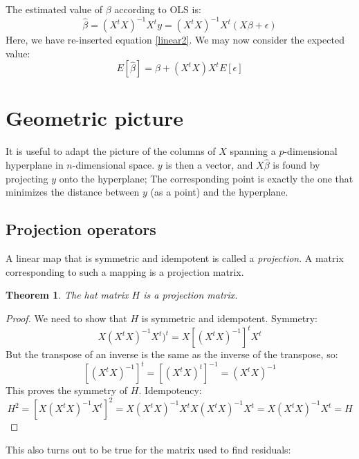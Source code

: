 \documentclass[12pt, a4paper]{article}
\newtheorem{theorem}{Theorem}[section]
\numberwithin{equation}{section}
\begin{document}
The estimated value of $\beta$ according to OLS is:
\begin{equation}
\hat{\beta}=(X^t X)^{-1}X^t y=(X^t X)^{-1}X^t(X\beta+\epsilon)
\end{equation}
Here, we have re-inserted equation \ref{linear2}. We may now consider the expected value:
\begin{equation}
\label{ols_var}
E[\hat{\beta}]=\beta+(X^t X)X^t E[\epsilon]
\end{equation}



\section{Geometric picture}
It is useful to adapt the picture of the columns of $X$ spanning a $p$-dimensional hyperplane in $n$-dimensional space. $y$ is then a vector, and $X\hat{\beta}$ is found by projecting $y$ onto the hyperplane; The corresponding point is exactly the one that minimizes the distance between $y$ (as a point) and the hyperplane.

\subsection{Projection operators}
A linear map that is symmetric and idempotent is called a \textit{projection}. A matrix corresponding to such a mapping is a projection matrix.

\begin{theorem}
The hat matrix $H$ is a projection matrix.
\end{theorem}
\begin{proof}
We need to show that $H$ is symmetric and idempotent. Symmetry:
\begin{equation}
X(X^t X)^{-1}X^t)^t=X\left[(X^t X)^{-1}\right]^t X^t
\end{equation}
But the transpose of an inverse is the same as the inverse of the transpose, so:
\begin{equation}
\left[(X^t X)^{-1}\right]^t=\left[(X^t X)^t\right]^{-1}=(X^t X)^{-1}
\end{equation}
This proves the symmetry of $H$. Idempotency:
\begin{equation}
H^2=\left[X(X^t X)^{-1}X^t\right]^2=X(X^t X)^{-1}X^tX(X^t X)^{-1}X^t=X(X^t X)^{-1}X^t=H
\end{equation}
\end{proof}

This also turns out to be true for the matrix used to find residuals:
\end{document}
